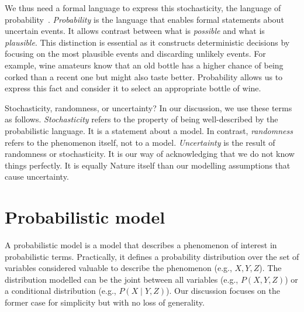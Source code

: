 We thus need a formal language to express this stochasticity, the language of probability~\citep{kolmogorov2018foundations}. \textit{Probability} is the language that enables formal statements about uncertain events. It allows contrast between what is \textit{possible} and what is \textit{plausible}. This distinction is essential as it constructs deterministic decisions by focusing on the most plausible events and discarding unlikely events. For example, wine amateurs know that an old bottle has a higher chance of being corked than a recent one but might also taste better. Probability allows us to express this fact and consider it to select an appropriate bottle of wine.

\begin{side_note}{Stochasticity, randomness, or uncertainty?}
In our discussion, we use these terms as follows. \textit{Stochasticity} refers to the property of being well-described by the probabilistic language. It is a statement about a model. In contrast, \textit{randomness} refers to the phenomenon itself, not to a model. \textit{Uncertainty} is the result of randomness or stochasticity. It is our way of acknowledging that we do not know things perfectly. It is equally Nature itself than our modelling assumptions that cause uncertainty.
\end{side_note}

\section{Probabilistic model}
A probabilistic model is a model that describes a phenomenon of interest in probabilistic terms. Practically, it defines a probability distribution over the set of variables considered valuable to describe the phenomenon (e.g., $X, Y, Z$). The distribution modelled can be the joint between all variables (e.g., $P(X, Y, Z)$) or a conditional distribution  (e.g., $P(X \mid Y, Z)$). Our discussion focuses on the former case for simplicity but with no loss of generality.

